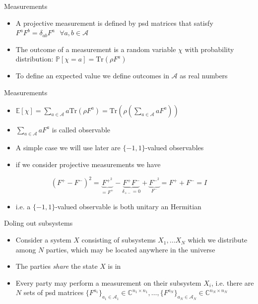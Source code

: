\begin{frame}{Measurements}
\begin{itemize}
    \item A projective measurement is defined by psd matrices that satisfy $F^aF^b = \delta_{ab}F^a \text{ } \forall a,b \in \mathcal{A}$
    \item The outcome of a measurement is a random variable $\chi$ with probability distribution: $\mathbb{P}[ \chi = a ] = \text{Tr}(\rho F^a)$
    \item To define an expected value we define outcomes in $\mathcal{A}$ as real numbers
\end{itemize}
    
\end{frame}


\begin{frame}{Measurements}
\begin{itemize}
    \item $\mathbb{E} [\chi ] = \sum_{a \in \mathcal{A}} a \text{Tr} ( \rho F^a ) =  \text{Tr} ( \rho ( \sum_{a \in \mathcal{A}} a F^a))$
    \item $\sum_{a \in \mathcal{A}} aF^a$ is called observable
    \item A simple case we will use later are $\{ -1, 1 \}$-valued observables
    \item if we consider projective measurements we have
\end{itemize}
    \begin{equation*}
(F^+-F^-)^2 = \underbrace{F^{+^2}}_{= F^+}- \underbrace{F^+F^-}_{\delta_{+-}=0} + \underbrace{F^{-^2}}_{F^-} = F^+ + F^- = I
\end{equation*}
\begin{itemize}
    \item i.e. a $\{ -1, 1 \}$-valued observable is both unitary an Hermitian 
\end{itemize}

\end{frame}

\begin{frame}{Doling out subsystems}
\begin{itemize}
    \item Consider a system $X$ consisting of subsystems $X_1, \dots X_N$ which we distribute among $N$ parties, which may be located anywhere in the universe
    \item The parties \textit{share} the state $X$ is in
    \item Every party may perform a measurement on their subsystem $X_i$, i.e. there are $N$ sets of psd matrices $\{F^{a_1} \}_{a_1 \in \mathcal{A}_1} \in \mathbb{C}^{n_1 \times n_1}, \dots , \{F^{a_N} \}_{a_N \in \mathcal{A}_N} \in \mathbb{C}^{n_N \times n_N} $
\end{itemize}
    
\end{frame}

